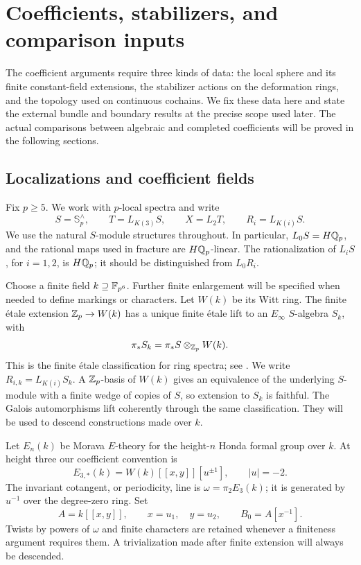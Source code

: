 \section{Coefficients, stabilizers, and comparison inputs}\label{h3:sec:framework}

The coefficient arguments require three kinds of data: the local sphere
and its finite constant-field extensions, the stabilizer actions on the
deformation rings, and the topology used on continuous cochains.  We fix
these data here and state the external bundle and boundary results at the
precise scope used later.  The actual comparisons between algebraic and
completed coefficients will be proved in the following sections.

\subsection{Localizations and coefficient fields}

Fix \(p\geq5\). We work with \(p\)-local spectra and write
\[
 S=\mathbb S_p^\wedge,\qquad T=L_{K(3)}S,\qquad
 X=L_2T,\qquad R_i=L_{K(i)}S.
\]
We use the natural \(S\)-module structures throughout. In particular,
\(L_0S=H\mathbb Q_p\), and the rational maps used in fracture are
\(H\mathbb Q_p\)-linear. The rationalization of \(L_iS\), for \(i=1,2\), is
\(H\mathbb Q_p\); it should be distinguished from \(L_0R_i\).

Choose a finite field \(k\supseteq\mathbb F_{p^6}\). Further finite enlargement
will be specified when needed to define markings or characters.
Let \(W(k)\) be its Witt ring. The finite étale extension
\(\mathbb Z_p\to W(k)\) has a unique finite étale lift to an \(E_\infty\)
\(S\)-algebra \(S_k\), with
\[
 \pi_*S_k=\pi_*S\otimes_{\mathbb Z_p}W(k).
\]
This is the finite étale classification for ring spectra;
see \cite[Theorem~2.32]{Mathew}. We write \(R_{i,k}=L_{K(i)}S_k\).
A \(\mathbb Z_p\)-basis of \(W(k)\) gives an equivalence of the underlying
\(S\)-module with a finite wedge of copies of \(S\), so extension to
\(S_k\) is faithful. The Galois automorphisms lift coherently through
the same classification. They will be used to descend constructions
made over \(k\).

Let \(E_n(k)\) be Morava \(E\)-theory for the height-\(n\) Honda formal
group over \(k\). At height three our coefficient convention is
\[
 E_{3,*}(k)=W(k)[[x,y]][u^{\pm1}],\qquad |u|=-2.
\]
The invariant cotangent, or periodicity, line is
\(\omega=\pi_2E_3(k)\); it is generated by \(u^{-1}\) over the
degree-zero ring. Set
\[
 A=k[[x,y]],\qquad x=u_1,\quad y=u_2,\qquad B_0=A[x^{-1}].
\]
Twists by powers of \(\omega\) and finite characters are retained
whenever a finiteness argument requires them. A trivialization made
after finite extension will always be descended.

